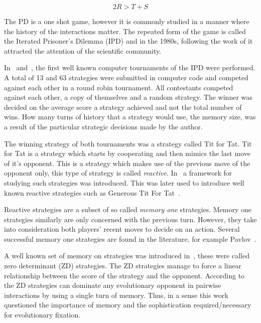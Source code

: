 \documentclass[10pt]{article}
\begin{document}
\begin{equation}\label{eq:pd_constrain_two}
    2R > T + S
\end{equation}

The PD is a one shot game, however it is commonly studied in a manner where the
history of the interactions matter. The repeated form of the game is called the
Iterated Prisoner's Dilemma (IPD) and in the 1980s, %
following the work of
\cite{Axelrod1980a, Axelrod1980b} it attracted the attention of the scientific
community.

In~\cite{Axelrod1980a} and~\cite{Axelrod1980b}, the first well known computer
tournaments of the IPD were performed. A total of 13 and 63 strategies were
submitted in computer code and competed against each other in a round robin
tournament. All contestants competed against each other, a copy of themselves
and a random strategy. The winner was decided on the average score a strategy
achieved and not the total number of wins. How many turns of history that a
strategy would use, the memory size, was a result of the particular strategic
decisions made by the author.

The winning strategy of both tournaments was a strategy called Tit for Tat. Tit
for Tat is a strategy which starts by cooperating and then mimics the last move
of it's opponent. This is a strategy which makes use of the previous move of the
opponent only, this type of strategy is called \textit{reactive}.
In~\cite{Nowak1989} a framework for studying such strategies was introduced.
This was later used to introduce well known reactive strategies such as Generous
Tit For Tat~\cite{Nowak1990}.

Reactive strategies are a subset of so called \textit{memory one} strategies.
Memory one strategies similarly are only concerned with the previous turn.
However, they take into consideration both players' recent moves to decide on an
action. Several successful memory one strategies are found in the literature,
for example Pavlov~\cite{Nowak1993}.

A well known set of memory on strategies was introduced in~\cite{Press2012},
these were called zero determinant (ZD) strategies. The ZD strategies manage to
force a linear relationship between the score of the strategy and the opponent.
According to~\cite{Press2012} the ZD strategies can dominate any evolutionary
opponent in pairwise interactions by using a single turn of memory. Thus, in a
sense this work questioned the importance of memory and the sophistication
required/necessary for evolutionary fixation.
\end{document}
